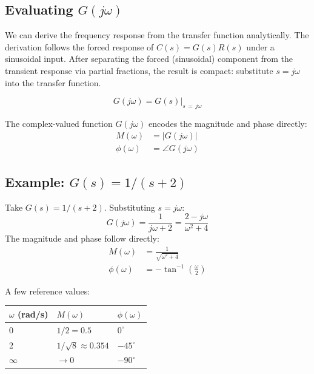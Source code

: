 \documentclass[../../book.tex]{subfiles}
\begin{document}
\subsection{Evaluating \texorpdfstring{$G(j\omega)$}{G(jω)}}
\label{sec:eval}

We can derive the frequency response from the transfer function analytically.
The derivation follows the forced response of $C(s) = G(s)R(s)$ under a
sinusoidal input.  After separating the forced (sinusoidal) component from the
transient response via partial fractions, the result is compact: substitute
$s = j\omega$ into the transfer function.

\begin{equation}
  \boxed{G(j\omega) = G(s)\big|_{s\,=\,j\omega}}
  \label{eq:G_jomega}
\end{equation}

The complex-valued function $G(j\omega)$ encodes the magnitude and phase
directly:
\begin{align}
  M(\omega) &= \bigl|G(j\omega)\bigr| \label{eq:magnitude} \\
  \phi(\omega) &= \angle G(j\omega) \label{eq:phase}
\end{align}

\subsection{Example: \texorpdfstring{$G(s) = 1/(s+2)$}{G(s) = 1/(s+2)}}
\label{sec:example_10_1}

Take $G(s) = 1/(s+2)$.  Substituting $s = j\omega$:
\begin{equation}
  G(j\omega) = \frac{1}{j\omega + 2} = \frac{2 - j\omega}{\omega^2 + 4}
  \label{eq:example_gjw}
\end{equation}
The magnitude and phase follow directly:
\begin{align}
  M(\omega) &= \frac{1}{\sqrt{\omega^2 + 4}} \label{eq:example_mag} \\[4pt]
  \phi(\omega) &= -\tan^{-1}\!\left(\frac{\omega}{2}\right) \label{eq:example_phase}
\end{align}

A few reference values:
\begin{center}
\begin{tabular}{@{}lll@{}}
\toprule
$\omega$ (rad/s) & $M(\omega)$ & $\phi(\omega)$ \\
\midrule
0   & $1/2 = 0.5$     & $0^\circ$   \\
2   & $1/\sqrt{8} \approx 0.354$ & $-45^\circ$ \\
$\infty$ & $\to 0$   & $-90^\circ$ \\
\bottomrule
\end{tabular}
\end{center}
\end{document}
